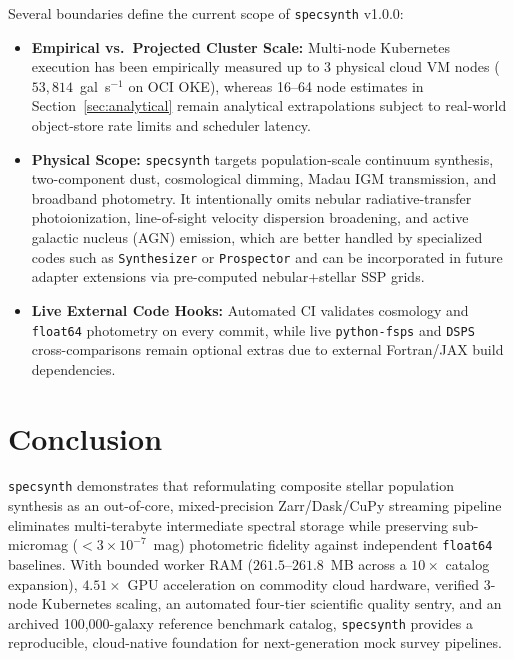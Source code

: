 \documentclass[preprint,12pt,authoryear]{elsarticle}
\begin{document}
Several boundaries define the current scope of \texttt{specsynth} v1.0.0:
\begin{itemize}
\item \textbf{Empirical vs.\ Projected Cluster Scale:} Multi-node Kubernetes execution has been empirically measured up to 3 physical cloud VM nodes ($53{,}814$~gal~s$^{-1}$ on OCI OKE), whereas 16--64 node estimates in Section~\ref{sec:analytical} remain analytical extrapolations subject to real-world object-store rate limits and scheduler latency.
\item \textbf{Physical Scope:} \texttt{specsynth} targets population-scale continuum synthesis, two-component dust, cosmological dimming, Madau IGM transmission, and broadband photometry. It intentionally omits nebular radiative-transfer photoionization, line-of-sight velocity dispersion broadening, and active galactic nucleus (AGN) emission, which are better handled by specialized codes such as \texttt{Synthesizer} \citep{lovell2025synthesizer} or \texttt{Prospector} \citep{johnson2021prospector} and can be incorporated in future adapter extensions via pre-computed nebular+stellar SSP grids.
\item \textbf{Live External Code Hooks:} Automated CI validates cosmology and \texttt{float64} photometry on every commit, while live \texttt{python-fsps} and \texttt{DSPS} cross-comparisons remain optional extras due to external Fortran/JAX build dependencies.
\end{itemize}

\section{Conclusion}
\label{sec:conclusion}

\texttt{specsynth} demonstrates that reformulating composite stellar population synthesis as an out-of-core, mixed-precision Zarr/Dask/CuPy streaming pipeline eliminates multi-terabyte intermediate spectral storage while preserving sub-micromag ($<3\times 10^{-7}$~mag) photometric fidelity against independent \texttt{float64} baselines. With bounded worker RAM ($261.5$--$261.8$~MB across a $10\times$ catalog expansion), $4.51\times$ GPU acceleration on commodity cloud hardware, verified 3-node Kubernetes scaling, an automated four-tier scientific quality sentry, and an archived 100,000-galaxy reference benchmark catalog, \texttt{specsynth} provides a reproducible, cloud-native foundation for next-generation mock survey pipelines.
\end{document}
